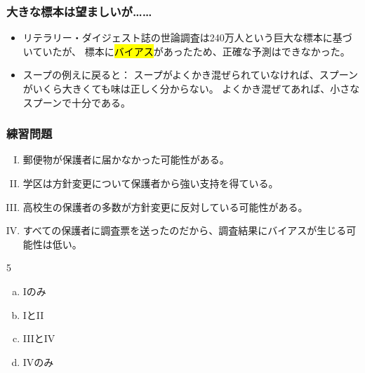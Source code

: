 
\begin{frame}
\frametitle{大きな標本は望ましいが……}

\begin{itemize}

\item リテラリー・ダイジェスト誌の世論調査は240万人という巨大な標本に基づいていたが、
標本に\hl{バイアス}があったため、正確な予測はできなかった。

\item スープの例えに戻ると：
スープがよくかき混ぜられていなければ、スプーンがいくら大きくても味は正しく分からない。
よくかき混ぜてあれば、小さなスプーンで十分である。

\end{itemize}

\end{frame}


\begin{frame}[shrink]
\frametitle{練習問題}

{\small
{}

\begin{enumerate}[I.]
\item 郵便物が保護者に届かなかった可能性がある。
\item 学区は方針変更について保護者から強い支持を得ている。
\item 高校生の保護者の多数が方針変更に反対している可能性がある。
\item すべての保護者に調査票を送ったのだから、調査結果にバイアスが生じる可能性は低い。
\end{enumerate}

\begin{multicols}{5}
\begin{enumerate}[(a)]
\item Iのみ
\item IとII
\item IIIとIV
\item IVのみ
\end{enumerate}
\end{multicols}
}

\end{frame}

